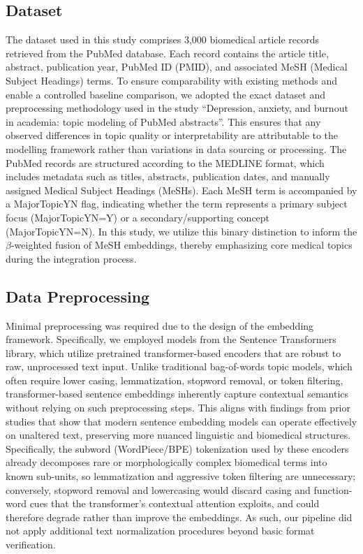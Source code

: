 \documentclass[authorproof,JACIII,researchpaper]{fujipressarticle}
\begin{document}
\subsection{Dataset}
The dataset used in this study comprises 3,000 biomedical article records retrieved from the PubMed database. Each record contains the article title, abstract, publication year, PubMed ID (PMID), and associated MeSH (Medical Subject Headings) terms. To ensure comparability with existing methods and enable a controlled baseline comparison, we adopted the exact dataset and preprocessing methodology used in the study ``Depression, anxiety, and burnout in academia: topic modeling of PubMed abstracts''\cite{lezhnina_depression_2023}. This ensures that any observed differences in topic quality or interpretability are attributable to the modelling framework rather than variations in data sourcing or processing.
The PubMed records are structured according to the MEDLINE format, which includes metadata such as titles, abstracts, publication dates, and manually assigned Medical Subject Headings (MeSHs). Each MeSH term is accompanied by a MajorTopicYN flag, indicating whether the term represents a primary subject focus (MajorTopicYN=Y) or a secondary/supporting concept (MajorTopicYN=N). In this study, we utilize this binary distinction to inform the $\beta$-weighted fusion of MeSH embeddings, thereby emphasizing core medical topics during the integration process.

\subsection{Data Preprocessing}
Minimal preprocessing was required due to the design of the embedding framework. Specifically, we employed models from the Sentence Transformers library, which utilize pretrained transformer-based encoders that are robust to raw, unprocessed text input\cite{reimers_sentence-bert_2019}. Unlike traditional bag-of-words topic models, which often require lower casing, lemmatization, stopword removal, or token filtering, transformer-based sentence embeddings inherently capture contextual semantics without relying on such preprocessing steps. This aligns with findings from prior studies that show that modern sentence embedding models can operate effectively on unaltered text, preserving more nuanced linguistic and biomedical structures\cite{wang_graph-embedded_2022}. Specifically, the subword (WordPiece/BPE) tokenization used by these encoders already decomposes rare or morphologically complex biomedical terms into known sub-units, so lemmatization and aggressive token filtering are unnecessary; conversely, stopword removal and lowercasing would discard casing and function-word cues that the transformer's contextual attention exploits, and could therefore degrade rather than improve the embeddings. As such, our pipeline did not apply additional text normalization procedures beyond basic format verification.
\end{document}

